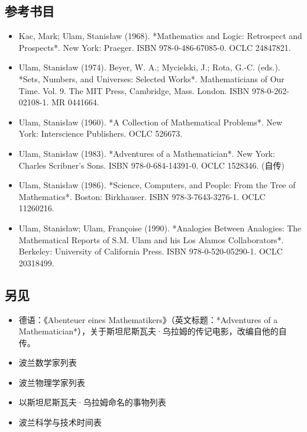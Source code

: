 \subsection{参考书目}
\begin{itemize}
\item Kac, Mark; Ulam, Stanisław (1968). *Mathematics and Logic: Retrospect and Prospects*. New York: Praeger. ISBN 978-0-486-67085-0. OCLC 24847821.
\item Ulam, Stanisław (1974). Beyer, W. A.; Mycielski, J.; Rota, G.-C. (eds.). *Sets, Numbers, and Universes: Selected Works*. Mathematicians of Our Time. Vol. 9. The MIT Press, Cambridge, Mass. London. ISBN 978-0-262-02108-1. MR 0441664.
\item Ulam, Stanisław (1960). *A Collection of Mathematical Problems*. New York: Interscience Publishers. OCLC 526673.
\item Ulam, Stanisław (1983). *Adventures of a Mathematician*. New York: Charles Scribner's Sons. ISBN 978-0-684-14391-0. OCLC 1528346. (自传)
\item Ulam, Stanisław (1986). *Science, Computers, and People: From the Tree of Mathematics*. Boston: Birkhauser. ISBN 978-3-7643-3276-1. OCLC 11260216.
\item Ulam, Stanisław; Ulam, Françoise (1990). *Analogies Between Analogies: The Mathematical Reports of S.M. Ulam and his Los Alamos Collaborators*. Berkeley: University of California Press. ISBN 978-0-520-05290-1. OCLC 20318499.
\end{itemize}
\subsection{另见}
\begin{itemize}
\item 德语：《Abenteuer eines Mathematikers》（英文标题：*Adventures of a Mathematician*），关于斯坦尼斯瓦夫·乌拉姆的传记电影，改编自他的自传。
\item 波兰数学家列表
\item 波兰物理学家列表
\item 以斯坦尼斯瓦夫·乌拉姆命名的事物列表
\item 波兰科学与技术时间表
\end{itemize}
